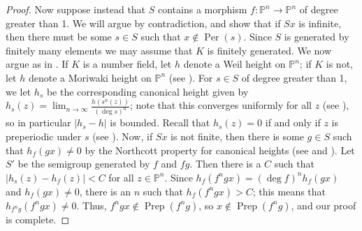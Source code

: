 \documentclass{amsart}
\newcommand{\lra}{\longrightarrow}
\newcommand{\bP}{\mathbb{P}}
\newcommand{\bZ} {\mathbb{Z}}
\DeclareMathOperator{\Prep}{Prep}
\DeclareMathOperator{\Per}{Per}
\newcommand{\fo}{\mathfrak o}
\newtheorem{lem}[thm]{Lemma}
\theoremstyle{definition}
\begin{document}
\begin{proof}
  Now suppose instead that $S$ contains a morphism
  $f: \bP^n \lra \bP^n$ of degree greater than 1.  We will argue by
  contradiction, and show that if $Sx$ is infinite, then there must be
  some $s \in S$ such that $x \notin \Per(s)$.  Since $S$ is generated
  by finitely many elements we may assume that $K$ is finitely
  generated. We now argue as in \cite[Section 3]{BHPT}.  If $K$ is a
  number field, let $h$ denote a Weil height on $\bP^n$; if $K$ is
  not, let $h$ denote a Moriwaki height on $\bP^n$ (see \cite{Mori1,
    Mori2}).  For $s \in S$ of degree greater than 1, we let $h_s$ be
  the corresponding canonical height given by
  $h_s(z) = \lim_{n \to \infty} \frac{h(s^n(z))}{(\deg s)^n}$; note
  that this converges uniformly for all $z$ (see \cite{CS93}), so in
  particular $|h_s - h|$ is bounded.  Recall that $h_s(z) = 0$ if and
  only if $z$ is preperiodic under $s$ (see \cite[Corollary
  3.5]{BHPT}).  Now, if $Sx$ is not finite, then there is some
  $g \in S$ such that $h_f(gx) \not= 0$ by the Northcott property for
  canonical heights (see \cite{Northcott} and \cite[Section
  3.2.2]{BHPT}). Let $S'$ be the semigroup
  generated by $f$ and $fg$.  Then there is a $C$ such that
  $|h_s(z) - h_f(z)| < C$ for all $z \in \bP^n$. Since
  $h_f(f^ng x) = (\deg f)^n h_f(gx)$ and $h_f(gx) \not= 0$, there is
  an $n$ such that $h_f(f^n g x) > C$; this means that
  $h_{f^n g}(f^ng x) \not= 0$.  Thus, $f^n gx \notin \Prep(f^ng)$, so
  $x \notin \Prep(f^ng)$, and our proof is complete.
\end{proof}





\end{document}
